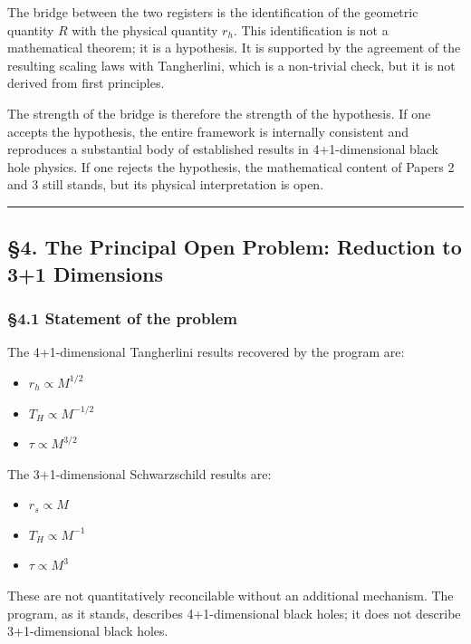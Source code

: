 \documentclass[a4paper,11pt]{article}
\theoremstyle{definition}
\providecommand{\tightlist}{\setlength{\itemsep}{0pt}\setlength{\parskip}{0pt}}
\begin{document}
The bridge between the two registers is the identification of the
geometric quantity \(R\) with the physical quantity \(r_h\). This
identification is not a mathematical theorem; it is a hypothesis. It is
supported by the agreement of the resulting scaling laws with
Tangherlini, which is a non-trivial check, but it is not derived from
first principles.

The strength of the bridge is therefore the strength of the hypothesis.
If one accepts the hypothesis, the entire framework is internally
consistent and reproduces a substantial body of established results in
4+1-dimensional black hole physics. If one rejects the hypothesis, the
mathematical content of Papers 2 and 3 still stands, but its physical
interpretation is open.

\begin{center}\rule{0.5\linewidth}{0.5pt}\end{center}

\subsection{§4. The Principal Open Problem: Reduction to 3+1
Dimensions}\label{the-principal-open-problem-reduction-to-31-dimensions}

\subsubsection{§4.1 Statement of the
problem}\label{statement-of-the-problem}

The 4+1-dimensional Tangherlini results recovered by the program are:

\begin{itemize}
\tightlist
\item
  \(r_h \propto M^{1/2}\)
\item
  \(T_H \propto M^{-1/2}\)
\item
  \(\tau \propto M^{3/2}\)
\end{itemize}

The 3+1-dimensional Schwarzschild results are:

\begin{itemize}
\tightlist
\item
  \(r_s \propto M\)
\item
  \(T_H \propto M^{-1}\)
\item
  \(\tau \propto M^3\)
\end{itemize}

These are not quantitatively reconcilable without an additional
mechanism. The program, as it stands, describes 4+1-dimensional black
holes; it does not describe 3+1-dimensional black holes.
\end{document}
